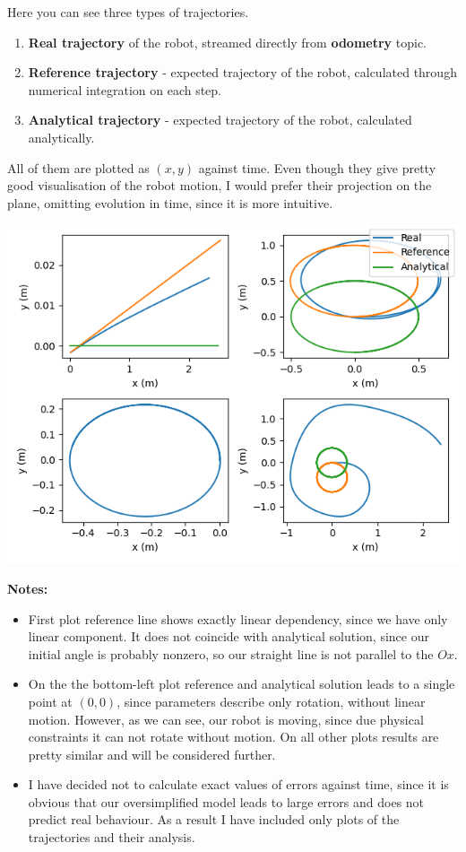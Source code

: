 \documentclass{article}
\begin{document}
Here you can see three types of trajectories.

\newpage

\begin{enumerate}
    \item \textbf{Real trajectory} of the robot, streamed directly from \textbf{odometry} topic.
    \item \textbf{Reference trajectory} - expected trajectory of the robot, calculated through numerical integration on each step.
    \item \textbf{Analytical trajectory} - expected trajectory of the robot, calculated analytically.
\end{enumerate}

All of them are plotted as $(x, y)$ against time. Even though they give
pretty good visualisation of the robot motion, I would prefer their
projection on the plane, omitting evolution in time, since it is more intuitive.

\includegraphics[scale=0.7]{trajectories.png}

\textbf{Notes:} 
\begin{itemize}
  \item First plot reference line shows exactly linear dependency, since
we have only linear component. It does not coincide with analytical solution, since
our initial angle is probably nonzero, so our straight line is not parallel to the $Ox$.
  \item On the the bottom-left plot reference and analytical solution leads to a single point at $(0, 0)$,
since parameters describe only rotation, without linear motion. However, as we can see, our robot is moving, since
due physical constraints it can not rotate without motion. On all other plots results are pretty similar and will
be considered further.
  \item I have decided not to calculate exact values of errors against time, since it is obvious
    that our oversimplified model leads to large errors and does not predict real behaviour. As a result
    I have included only plots of the trajectories and their analysis.
\end{itemize}
\end{document}

